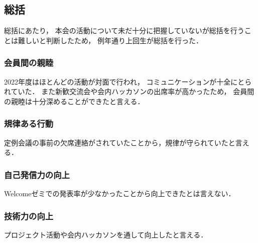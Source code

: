 \subsection*{\firstGrade{}総括}


\firstGrade{}総括にあたり，
本会の活動について未だ十分に把握していない\firstGrade{}が総括を行うことは難しいと判断したため，
例年通り上回生が総括を行った．

\subsubsection*{会員間の親睦}
2022年度はほとんどの活動が対面で行われ，
コミュニケーションが十全にとられていた．
また新歓交流会や会内ハッカソンの出席率が高かったため，
会員間の親睦は十分深めることができたと言える．

\subsubsection*{規律ある行動}
定例会議の事前の欠席連絡がされていたことから，規律が守られていたと言える．

\subsubsection*{自己発信力の向上}
Welcomeゼミでの発表率が少なかったことから向上できたとは言えない．

\subsubsection*{技術力の向上}
プロジェクト活動や会内ハッカソンを通して向上したと言える．
